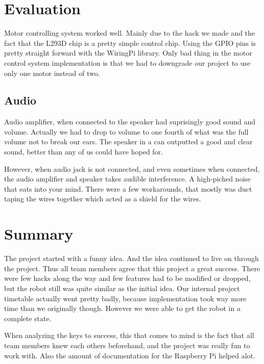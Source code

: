\documentclass[english,11pt,twoside,a4paper]{article}
\begin{document}
\section{Evaluation}

Motor controlling system worked well. Mainly due to the hack we made and the fact that the L293D chip is a pretty simple control chip. Using the GPIO pins is pretty straight forward with the WiringPi library. Only bad thing in the motor control system implementation is that we had to downgrade our project to use only one motor instead of two.

\subsection{Audio}

Audio amplifier, when connected to the speaker had suprisingly good sound and volume. Actually we had to drop to volume to one fourth of what was the full volume not to break our ears. The speaker in a can outputted a good and clear sound, better than any of us could have hoped for.

However, when audio jack is not connected, and even sometimes when connected, the audio amplifier and speaker takes audible interference. A high-piched noise that eats into your mind. There were a few workarounds, that mostly was duct taping the wires together which acted as a shield for the wires.

\section{Summary}

The project started with a funny idea. And the idea continued to live on through the project. Thus all team members agree that this project a great success. There were few hacks along the way and few features had to be modified or dropped, but the robot still was quite similar as the initial idea. Our internal project timetable actually went pretty badly, because implementation took way more time than we originally though. However we were able to get the robot in a complete state.

When analyzing the keys to success, this that comes to mind is the fact that all team members knew each others beforehand, and the project was really fun to work with. Also the amount of documentation for the Raspberry Pi helped alot.
\end{document}
